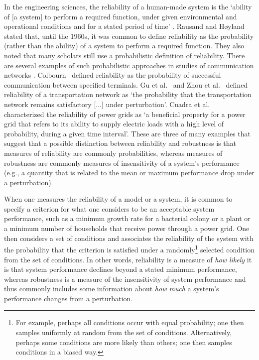 \documentclass{comnet-mod}
\begin{document}
In the engineering sciences, the reliability of a human-made system is the `ability of [a system] to perform a required function, under given environmental and operational conditions and for a stated period of time' \cite[p.\,5]{Rausand2004}. Rausand and H{\o}yland~\cite[p.\,5]{Rausand2004} stated that, until the 1960s, it was common to define reliability as the probability (rather than the ability) of a system to perform a required function. They also noted that many scholars still use a probabilistic definition of reliability. There are several examples of such probabilistic approaches in studies of communication networks \cite{Colbourn1987, Bhamra2011, Walsh2013, Gu2020}. Colbourn~\cite{Colbourn1987} defined reliability as the probability of successful communication between specified terminals. Gu et al.~\cite{Gu2020} and Zhou et al.~\cite{Zhou2020} defined reliability of a transportation network as `the probability that the transportation network remains satisfactory [...] under perturbation'. Cuadra et al.~\cite{Cuadra2015} characterized the reliability of power grids as `a beneficial property for a power grid that refers to its ability to supply electric loads with a high level of probability, during a given time interval'. These are three of many examples that suggest that a possible distinction between reliability and robustness is that measures of reliability are commonly probabilities, whereas measures of robustness are commonly measures of insensitivity of a system's performance (e.g., a quantity that is related to the mean or maximum performance drop under a perturbation). 

When one measures the reliability of a model or a system, it is common to specify a criterion for what one considers to be an acceptable system performance, such as a  minimum growth rate for a bacterial colony or a plant or a minimum number of households that receive power through a power grid. One then considers a set of conditions and associates the reliability of the system with the probability that the criterion is satisfied under a randomly\footnote{For example, perhaps all conditions occur with equal probability; one then samples uniformly at random from the set of conditions. Alternatively, perhaps some conditions are more likely than others; one then samples conditions in a biased way.} selected condition from the set of conditions. 
In other words, reliability is a measure of \textit{how likely} it is that system performance declines beyond a stated minimum performance, whereas robustness is a measure of the insensitivity of system performance and thus commonly includes some information about \textit{how much} a system's performance changes from a perturbation. 
\end{document}
